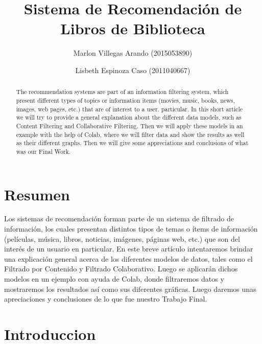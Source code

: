 \documentclass[preprint,12pt]{elsarticle}
\begin{document}
	
	\begin{frontmatter}
		
		
		\title{\huge Sistema de Recomendación de Libros de Biblioteca}
		\author{Marlon Villegas Arando (2015053890)}
		\author{Lisbeth Espinoza Caso  (2011040667)}
		
		\address{Tacna, Perú}
		\address{2019}
		
		\begin{abstract}
			
The recommendation systems are part of an information filtering system, which present different types of topics or information items (movies, music, books, news, images, web pages, etc.) that are of interest to a user. particular. In this short article we will try to provide a general explanation about the different data models, such as Content Filtering and Collaborative Filtering.
Then we will apply these models in an example with the help of Colab, where we will filter data and show the results as well as their different graphs.
Then we will give some appreciations and conclusions of what was our Final Work.\\
		\end{abstract}
\end{frontmatter}

	
	
	\section{Resumen}
Los sistemas de recomendación forman parte de un sistema de filtrado de información, los cuales presentan distintos tipos de temas o ítems de información (películas, música, libros, noticias, imágenes, páginas web, etc.) que son del interés de un usuario en particular. En este breve artículo intentaremos brindar una explicación general acerca de los diferentes modelos de datos, tales como el Filtrado por Contenido y Filtrado Colaborativo.
Luego se aplicarán dichos modelos en un ejemplo con ayuda de Colab, donde filtraremos datos y mostraremos los resultados así como sus diferentes gráficas.
Luego daremos unas apreciaciones y conclusiones de lo que fue nuestro Trabajo Final.\\
	
	

\section{Introduccion}
\end{document}
